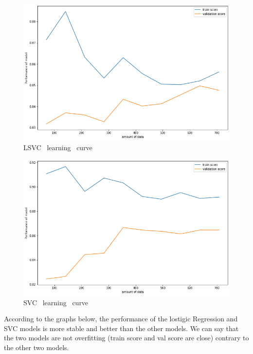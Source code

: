 \documentclass[12pt]{article}
\begin{document}
\begin{figure}[H]
\begin{center}
\includegraphics[scale=0.6]{learning_curve_3.png} 
\caption[]{ LSVC \ learning \ curve }
\end{center}
\end{figure}

\begin{figure}[H]
\begin{center}
\includegraphics[scale=0.6]{learning_curve_4.png} 
\caption[]{ SVC \ learning \ curve }
\end{center}
\end{figure}


According to the graphs below, the performance of the lostigic Regression and SVC models is more stable and better than the other models. We can say that the two models are not overfitting
(train score and val score are close) contrary to the other two models.
\end{document}
